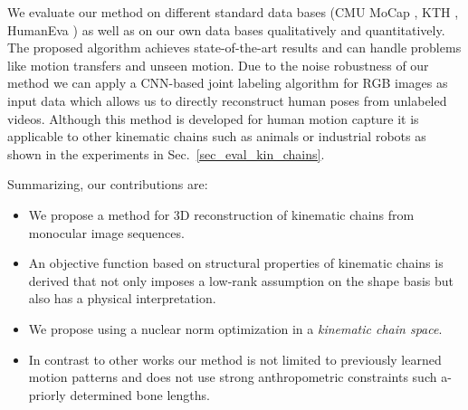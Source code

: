 \documentclass[10pt,letterpaper]{article}
\begin{document}
We evaluate our method on different standard data bases (CMU MoCap \cite{cmumocap}, KTH \cite{kazemi2013multi}, HumanEva \cite{humaneva}) as well as on our own data bases qualitatively and quantitatively. The proposed algorithm achieves state-of-the-art results and can handle problems like motion transfers and unseen motion. Due to the noise robustness of our method we can apply a CNN-based joint labeling algorithm \cite{Newell2016} for RGB images as input data which allows us to directly reconstruct human poses from unlabeled videos. Although this method is developed for human motion capture it is applicable to other kinematic chains such as animals or industrial robots as shown in the experiments in Sec.~\ref{sec_eval_kin_chains}.

Summarizing, our contributions are:
\begin{itemize}
	\item We propose a method for 3D reconstruction of kinematic chains from monocular image sequences.
	\item An objective function based on structural properties of kinematic chains is derived that not only imposes a low-rank assumption on the shape basis but also has a physical interpretation.
	\item We propose using a nuclear norm optimization in a \textit{kinematic chain space}.
	\item In contrast to other works our method is not limited to previously learned motion patterns and does not use strong anthropometric constraints such a-priorly determined bone lengths.
\end{itemize}
\end{document}
